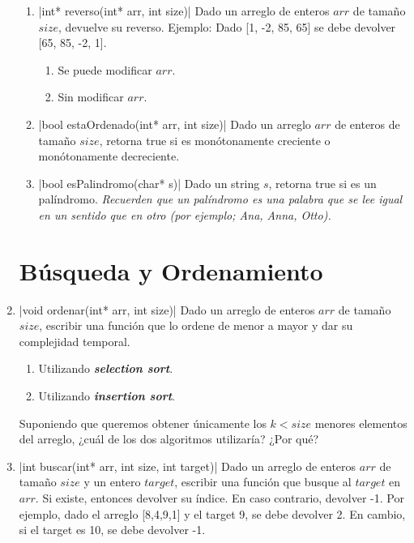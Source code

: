\documentclass[titlepage,oneside]{book}
\begin{document}
\begin{enumerate}
\begin{enumerate}
        \item{}|int* reverso(int* arr, int size)|
        Dado un arreglo de enteros $arr$ de tamaño $size$, devuelve su reverso. \newline
        Ejemplo: Dado [1, -2, 85, 65] se debe devolver [65, 85, -2, 1].
        \begin{enumerate}
            \item Se puede modificar $arr$.
            \item Sin modificar $arr$.
        \end{enumerate}

        \item{}|bool estaOrdenado(int* arr, int size)|
        Dado un arreglo $arr$ de enteros de tamaño $size$, retorna true si es monótonamente creciente o monótonamente decreciente.

        \item{}|bool esPalindromo(char* s)|
        Dado un string $s$, retorna true si es un palíndromo. \textit{Recuerden que un palíndromo es una palabra que se lee igual en un sentido que en otro (por ejemplo; Ana, Anna, Otto).}
    \end{enumerate}

    \section{Búsqueda y Ordenamiento}

    \item{}|void ordenar(int* arr, int size)|
    Dado un arreglo de enteros $arr$ de tamaño $size$, escribir una función que lo ordene de menor a mayor y dar su complejidad temporal.
    \begin{enumerate}
     \item Utilizando \textbf{\textit{selection sort}}.
     \item Utilizando \textbf{\textit{insertion sort}}. 
    \end{enumerate}

    Suponiendo que queremos obtener únicamente los $k < size$ menores elementos del arreglo, ¿cuál de los dos algoritmos utilizaría? ¿Por qué?

    \item{}|int buscar(int* arr, int size, int target)|
    Dado un arreglo de enteros $arr$ de tamaño $size$ y un entero $target$,
    escribir una función que busque al $target$ en $arr$. Si existe, entonces devolver su índice. En caso contrario, devolver -1. \newline Por ejemplo, dado el arreglo [8,4,9,1] y el target 9, se debe devolver 2. En cambio, si el target es 10, se debe devolver -1.


\end{enumerate}
\end{document}
